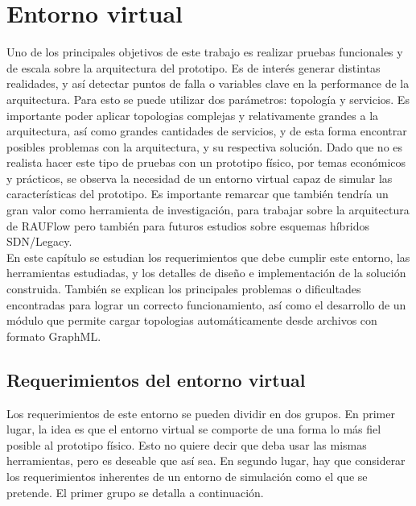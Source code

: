\chapter{Entorno virtual}

\graphicspath{{Chapter3/Figs/}}

Uno de los principales objetivos de este trabajo es realizar pruebas funcionales y de escala sobre la arquitectura del prototipo. Es de interés generar distintas realidades, y así detectar puntos de falla o variables clave en la performance de la arquitectura. Para esto se puede utilizar dos parámetros: topología y servicios. Es importante poder aplicar topologias complejas y relativamente grandes a la arquitectura, así como grandes cantidades de servicios, y de esta forma encontrar posibles problemas con la arquitectura, y su respectiva solución. Dado que no es realista hacer este tipo de pruebas con un prototipo físico, por temas económicos y prácticos, se observa la necesidad de un entorno virtual capaz de simular las características del prototipo. Es importante remarcar que también tendría un gran valor como herramienta de investigación, para trabajar sobre la arquitectura de RAUFlow pero también para futuros estudios sobre esquemas híbridos SDN/Legacy. \\
En este capítulo se estudian los requerimientos que debe cumplir este entorno, las herramientas estudiadas, y los detalles de diseño e implementación de la solución construida. También se explican los principales problemas o dificultades encontradas para lograr un correcto funcionamiento, así como el desarrollo de un módulo que permite cargar topologias automáticamente desde archivos con formato GraphML.

\section{Requerimientos del entorno virtual}
Los requerimientos de este entorno se pueden dividir en dos grupos. En primer lugar, la idea es que el entorno virtual se comporte de una forma lo más fiel posible al prototipo físico. Esto no quiere decir que deba usar las mismas herramientas, pero es deseable que así sea. En segundo lugar, hay que considerar los requerimientos inherentes de un entorno de simulación como el que se pretende. El primer grupo se detalla a continuación.

